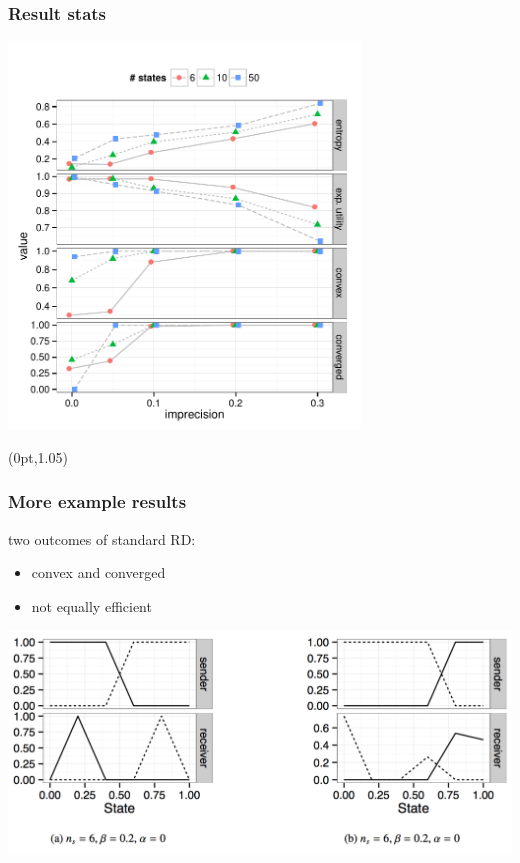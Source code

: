\documentclass[fleqn,9pt,xcolor=dvipsnames]{beamer}
\newcommand{\toler}{\ensuremath{\beta}} %
\newcommand{\mygray}[1]{{\color{gray}{#1}}}
\newcommand{\slideFN}[1]{%
  \begin{textblock*}{\paperwidth}(0pt,1.05\textheight)
    \hfill \footnotesize{\mygray{#1}} \hspace{.5em}
  \end{textblock*}}
\begin{document}
\begin{frame}
  \frametitle{Result stats}
  
  \centering

  \includegraphics[width=0.7\textwidth]{../../paper/version_04/plots/MeanMetrics3.pdf}

  \slideFN{$\toler = 0.1$}

\end{frame}

\begin{frame}
  \frametitle{More example results}
  
  two outcomes of standard RD:
  \begin{itemize}
  \item convex and converged
  \item not equally efficient
  \end{itemize}

  \bigskip

  \centering

  \includegraphics[width=\textwidth]{plots/exampleStrats2.png}

\end{frame}
\end{document}
